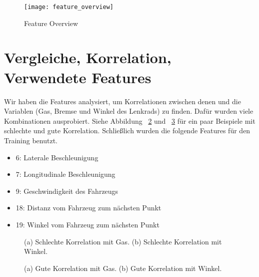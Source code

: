 \begin{figure}[htbp]
\begin{center}
\texttt{[image: feature\_overview]}
\caption{Feature Overview}
\label{fig:feature_overview}
\end{center}
\end{figure}


\section{Vergleiche, Korrelation, Verwendete Features} %
\label{sec:Vergleiche_Korrelation}
Wir haben die Features analysiert, um Korrelationen zwischen denen und die Variablen (Gas, Bremse und Winkel des Lenkrads) zu finden. Dafür wurden viele Kombinationen ausprobiert. Siehe Abbildung ~\ref{fig:with-no-correlation} und ~\ref{fig:with-correlation} für ein paar Beispiele mit schlechte und gute Korrelation. Schließlich wurden die folgende Features für den Training benutzt.

\begin{itemize}
	\item 6: Laterale Beschleunigung
	\item 7: Longitudinale Beschleunigung
	\item 9: Geschwindigkeit des Fahrzeugs
	\item 18: Distanz vom Fahrzeug zum nächsten Punkt
	\item 19: Winkel vom Fahrzeug zum nächsten Punkt
\end{itemize}

\begin{figure}[htbp]
\begin{center}
\hspace{1cm}            
\caption{(a) Schlechte Korrelation mit Gas. (b) Schlechte Korrelation mit Winkel.}
\label{fig:with-no-correlation}
\end{center}
\end{figure}

\begin{figure}[htbp]
\begin{center}
\hspace{1cm}            
\caption{(a) Gute Korrelation mit Gas. (b) Gute Korrelation mit Winkel.}
\label{fig:with-correlation}
\end{center}
\end{figure}



